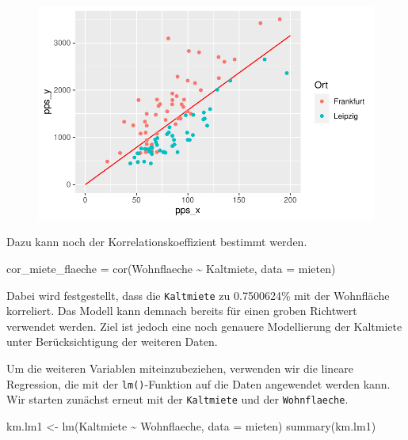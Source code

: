 \documentclass[
  a4paper,
  DIV=11]{scrartcl}
\newenvironment{Shaded}{\begin{snugshade}}{\end{snugshade}}
\newcommand{\AttributeTok}[1]{\textcolor[rgb]{0.40,0.45,0.13}{#1}}
\newcommand{\FunctionTok}[1]{\textcolor[rgb]{0.28,0.35,0.67}{#1}}
\newcommand{\NormalTok}[1]{\textcolor[rgb]{0.00,0.23,0.31}{#1}}
\newcommand{\OtherTok}[1]{\textcolor[rgb]{0.00,0.23,0.31}{#1}}
\newcommand{\SpecialCharTok}[1]{\textcolor[rgb]{0.37,0.37,0.37}{#1}}
\begin{document}
\begin{figure}[H]

{\centering \includegraphics{Mietmodellierung_files/figure-pdf/unnamed-chunk-17-1.pdf}

}

\end{figure}

Dazu kann noch der Korrelationskoeffizient bestimmt werden.

\begin{Shaded}
\begin{Highlighting}[]
\NormalTok{cor\_miete\_flaeche }\OtherTok{=} \FunctionTok{cor}\NormalTok{(Wohnflaeche }\SpecialCharTok{\textasciitilde{}}\NormalTok{ Kaltmiete, }\AttributeTok{data =}\NormalTok{ mieten)}
\end{Highlighting}
\end{Shaded}

Dabei wird festgestellt, dass die \texttt{Kaltmiete} zu 0.7500624\% mit
der Wohnfläche korreliert. Das Modell kann demnach bereits für einen
groben Richtwert verwendet werden. Ziel ist jedoch eine noch genauere
Modellierung der Kaltmiete unter Berücksichtigung der weiteren Daten.

Um die weiteren Variablen miteinzubeziehen, verwenden wir die lineare
Regression, die mit der \texttt{lm()}-Funktion auf die Daten angewendet
werden kann. Wir starten zunächst erneut mit der \texttt{Kaltmiete} und
der \texttt{Wohnflaeche}.

\begin{Shaded}
\begin{Highlighting}[]
\NormalTok{km.lm1 }\OtherTok{\textless{}{-}} \FunctionTok{lm}\NormalTok{(Kaltmiete }\SpecialCharTok{\textasciitilde{}}\NormalTok{ Wohnflaeche, }\AttributeTok{data =}\NormalTok{ mieten)}
\FunctionTok{summary}\NormalTok{(km.lm1)}
\end{Highlighting}
\end{Shaded}
\end{document}
